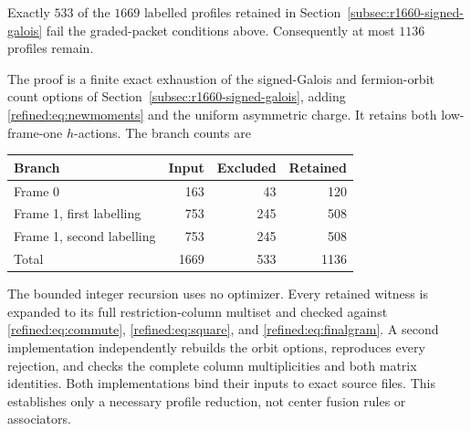 \begin{proposition}
Exactly $533$ of the $1669$ labelled profiles retained in Section~\ref{subsec:r1660-signed-galois} fail the graded-packet conditions above. Consequently at most $1136$ profiles remain.
\end{proposition}
The proof is a finite exact exhaustion of the signed-Galois and fermion-orbit count options of Section~\ref{subsec:r1660-signed-galois}, adding \eqref{refined:eq:newmoments} and the uniform asymmetric charge. It retains both low-frame-one $h$-actions. The branch counts are
\begin{center}
\begin{tabular}{lrrr}
\toprule
Branch&Input&Excluded&Retained\\
\midrule
Frame 0&163&43&120\\
Frame 1, first labelling&753&245&508\\
Frame 1, second labelling&753&245&508\\
\midrule
Total&1669&533&1136\\
\bottomrule
\end{tabular}
\end{center}
The bounded integer recursion uses no optimizer. Every retained witness is expanded to its full restriction-column multiset and checked against \eqref{refined:eq:commute}, \eqref{refined:eq:square}, and \eqref{refined:eq:finalgram}. A second implementation independently rebuilds the orbit options, reproduces every rejection, and checks the complete column multiplicities and both matrix identities. Both implementations bind their inputs to exact source files. This establishes only a necessary profile reduction, not center fusion rules or associators.

